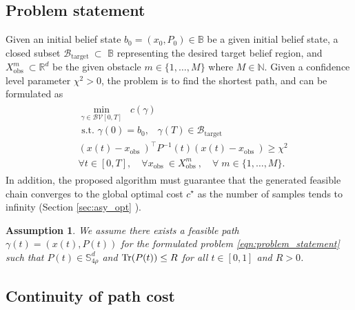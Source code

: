 \documentclass[Afour,sageh,times]{sagej}
\newtheorem{assumption}{\bf Assumption}
\begin{document}
\subsection{Problem statement}
Given an initial belief state $b_0=\left(x_0, P_0\right) \in \mathbb{B}$ be a given initial belief state, a closed subset $\mathcal{B}_{\text {target }} \subset$ $\mathbb{B}$ representing the desired target belief region, and $X_{\text {obs }}^m \subset \mathbb{R}^d$ be the given obstacle $m \in\{1, \ldots, M\}$ where $M\in\mathbb{N}$. Given a confidence level parameter $\chi^2>0$, the problem is to find the shortest path, and can be formulated  as
\begin{align}
\begin{array}{cl}
&\underset{{\gamma \in \mathcal{B} \mathcal{V}[0, T]}}{\min}\;\; c(\gamma) \\
&\text { s.t. }  \gamma(0)=b_0,\;\;\; \gamma(T) \in \mathcal{B}_{\text {target }} \\
& \left(x(t)-x_{\text {obs }}\right)^{\top} P^{-1}(t)\left(x(t)-x_{\text {obs }}\right) \geq \chi^2 \\
& \forall t \in[0, T], \quad \forall x_{\text {obs }} \in X_{\text {obs }}^m, \quad \forall\; m \in\{1, \ldots, M\} .
\end{array}
\label{eqn:problem_statement}
\end{align}
In addition, the proposed algorithm must guarantee that the generated feasible chain converges to the global optimal cost $c^\star$ as the number of samples tends to infinity (Section \ref{sec:asy_opt} ).
\begin{assumption}
\normalfont    We assume there exists a feasible path $\gamma(t)=(x(t),P(t))$ for {the formulated problem} \eqref{eqn:problem_statement} such that $P(t) \in \mathbb{S}^d_{4\rho}$ and $\textup{Tr}(P(t))\leq R$\; for all $t\in[0,1]$ and $R>0$. 
\end{assumption}
\subsection{Continuity of path cost}
\end{document}
